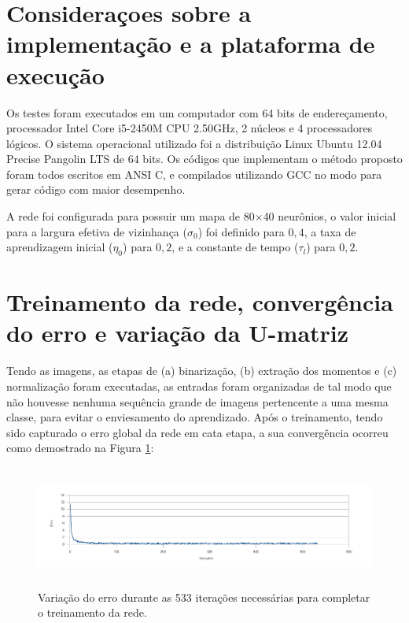\section{Consideraçoes sobre a implementação e a plataforma de execução}

Os testes foram executados em um computador com 64 bits de endereçamento,
processador Intel Core i5-2450M CPU 2.50GHz, 2 núcleos e 4 processadores
lógicos. O sistema operacional utilizado foi a distribuição Linux Ubuntu 12.04
Precise Pangolin LTS de 64 bits. Os códigos que implementam o método proposto
foram todos escritos em ANSI C, e compilados utilizando GCC no modo para gerar
código com maior desempenho.

A rede foi configurada para possuir um mapa de 80$ \times $40 neurônios, o valor
inicial para a largura efetiva de vizinhança ($ \sigma_0 $) foi definido para
$ 0,4 $, a taxa de aprendizagem inicial ($ \eta_0 $) para $ 0,2 $,
e a constante de tempo ($ \tau_l $) para $ 0,2 $.

\section{Treinamento da rede, convergência do erro e variação da U-matriz}\label{sec:treinamento_rede}

Tendo as imagens, as etapas de (a) binarização, (b) extração dos momentos e (c)
normalização foram executadas, as entradas foram organizadas de tal modo que
não houvesse nenhuma sequência grande de imagens pertencente a uma mesma classe,
para evitar o enviesamento do aprendizado. Após o treinamento, tendo sido
capturado o erro global da rede em cata etapa, a sua convergência ocorreu
como demostrado na Figura \ref{fig:error}:

\begin{figure}[H]
  \begin{center}
    \includegraphics[height=4cm]{imagens/error.pdf}
  \end{center}
  \caption{ Variação do erro durante as 533 iterações necessárias para completar
    o treinamento da rede.}
  \label{fig:error}
\end{figure}

